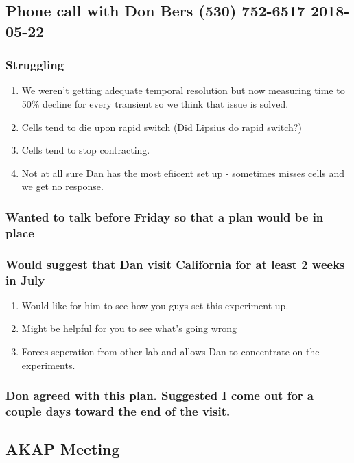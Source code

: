 \documentclass[11pt]{article}
\begin{document}
\subsection{Phone call with Don Bers (530) 752-6517‬ 2018-05-22}
\label{sec:org11bde74}
\subsubsection{Struggling}
\label{sec:orgc46ff1b}
\begin{enumerate}
\item We weren't getting adequate temporal resolution but now measuring time to 50\% decline for every transient so we think that issue is solved.
\label{sec:org01c4a4c}
\item Cells tend to die upon rapid switch (Did Lipsius do rapid switch?)
\label{sec:orgb71a2e6}
\item Cells tend to stop contracting.
\label{sec:orgfcdfd8a}
\item Not at all sure Dan has the most efiicent set up - sometimes misses cells and we get no response.
\label{sec:orgf10d46f}
\end{enumerate}
\subsubsection{Wanted to talk before Friday so that a plan would be in place}
\label{sec:org607aa59}
\subsubsection{Would suggest that Dan visit California for at least 2 weeks in July}
\label{sec:org2b58d46}
\begin{enumerate}
\item Would like for him to see how you guys set this experiment up.
\label{sec:orgcdbdd32}
\item Might be helpful for you to see what's going wrong
\label{sec:org9470a2c}
\item Forces seperation from other lab and allows Dan to concentrate on the experiments.
\label{sec:org6a8967a}
\end{enumerate}
\subsubsection{Don agreed with this plan.  Suggested I come out for a couple days toward the end of the visit.}
\label{sec:org1a9e7ca}
\subsection{AKAP Meeting}
\label{sec:org8ba118e}
\end{document}
